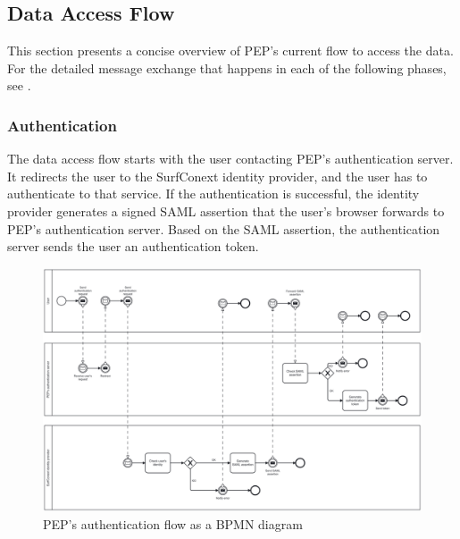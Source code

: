 \documentclass{report}
\begin{document}
\subsection{Data Access Flow}
This section presents a concise overview of PEP's current flow to access the data. For the detailed message exchange that happens in each of the following phases, see
\cite{pep-blueprint}.

\subsubsection{Authentication}
The data access flow starts with the user contacting PEP's authentication server. It redirects the user to the SurfConext identity provider, and the user has to authenticate to that 
service. If the authentication is successful, the identity provider generates a signed SAML assertion that the user's browser forwards to PEP's authentication server. Based on the
SAML assertion, the authentication server sends the user an authentication token.

\begin{figure}[H]
	\includegraphics[scale=0.1, angle=-90]{authentication.png}
	\caption{PEP's authentication flow as a BPMN diagram}
	\label{bpmn-authentication-flow}
\end{figure}
\end{document}
